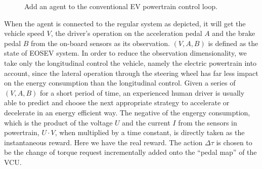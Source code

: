 \documentclass[conference]{IEEEtran}
\begin{document}
\begin{figure}[htb]
	\centering
	\caption{Add an agent to the conventional EV powertrain control loop.}\label{fig:Agent_Powertrain}
\end{figure}

When the agent is connected to the regular system as depicted, it will get the vehicle speed $V$, the driver's operation on the acceleration pedal $A$ and the brake pedal $B$ from the on-board sensors as its observation. $(V,A,B)$ is defined as the state of EOSEV system. In order to reduce the observation dimensionality, we take only the longitudinal control the vehicle, namely the electric powertrain into account, since the lateral operation through the steering wheel has far less impact on the energy consumption than the longitudinal control. Given a series of $(V,A,B)$ for a short period of time, an experienced human driver is usually able to predict and choose the next appropriate strategy to accelerate or decelerate in an energy efficient way. The negative of the engergy consumption, which is the product of the voltage $U$ and the current $I$ from the sensors in powertrain, $U\cdot V$, when multiplied by a time constant, is directly taken as the instantaneous reward. Here we have the real reward. The action $\Delta\tau$ is chosen to be the change of torque request incrementally added onto the ``pedal map'' of the VCU\@.
\end{document}
